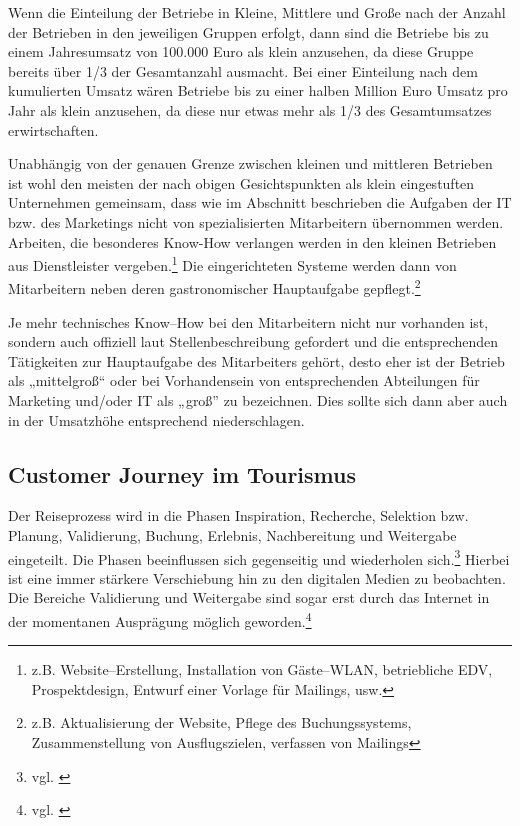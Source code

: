 Wenn die Einteilung der Betriebe in Kleine, Mittlere und Große nach der Anzahl der Betrieben in den jeweiligen Gruppen erfolgt, dann sind die Betriebe bis zu einem Jahresumsatz von 100.000 Euro als klein anzusehen, da diese Gruppe bereits über 1/3 der Gesamtanzahl ausmacht. Bei einer Einteilung nach dem kumulierten Umsatz wären Betriebe bis zu einer halben Million Euro Umsatz pro Jahr als klein anzusehen, da diese nur etwas mehr als 1/3 des Gesamtumsatzes erwirtschaften.

Unabhängig von der genauen Grenze zwischen kleinen und mittleren Betrieben ist wohl den meisten der nach obigen Gesichtspunkten als klein eingestuften Unternehmen gemeinsam, dass wie im Abschnitt  beschrieben die Aufgaben der IT bzw. des Marketings nicht von spezialisierten Mitarbeitern übernommen werden. Arbeiten, die besonderes Know-How verlangen werden in den kleinen Betrieben aus Dienstleister vergeben.\footnote{z.B. Website–Erstellung, Installation von Gäste–WLAN, betriebliche EDV, Prospektdesign, Entwurf einer Vorlage für Mailings, usw.} Die eingerichteten Systeme werden dann von Mitarbeitern neben deren gastronomischer Hauptaufgabe gepflegt.\footnote{z.B. Aktualisierung der Website, Pflege des Buchungssystems, Zusammenstellung von Ausflugszielen, verfassen von Mailings}

Je mehr technisches Know–How bei den Mitarbeitern nicht nur vorhanden ist, sondern auch offiziell laut Stellenbeschreibung gefordert und die entsprechenden Tätigkeiten zur Hauptaufgabe des Mitarbeiters gehört, desto eher ist der Betrieb als „mittelgroß“ oder bei Vorhandensein von entsprechenden Abteilungen für Marketing und/oder IT als „groß” zu bezeichnen. Dies sollte sich dann aber auch in der  Umsatzhöhe entsprechend niederschlagen.

\subsection{Customer Journey im Tourismus} %
\label{sub:customer_journey_im_tourismus}
Der Reiseprozess wird in die Phasen Inspiration, Recherche, Selektion bzw. Planung, Validierung, Buchung, Erlebnis, Nachbereitung und Weitergabe eingeteilt. Die Phasen beeinflussen sich gegenseitig und wiederholen sich.\footnote{vgl. \cite{cole:7step}}
Hierbei ist eine immer stärkere Verschiebung hin zu den digitalen Medien zu beobachten. Die Bereiche Validierung und Weitergabe sind sogar erst durch das Internet in der momentanen Ausprägung möglich geworden.\footnote{vgl. \cite{buhl}}

